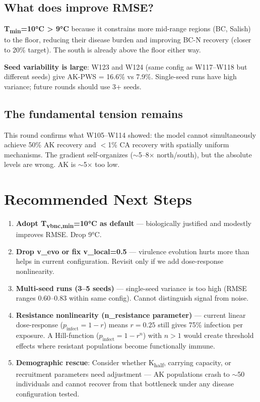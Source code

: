 \documentclass[11pt]{article}
\begin{document}
\subsection{What does improve RMSE?}

\textbf{T\textsubscript{min}=10°C > 9°C} because it constrains more mid-range regions (BC, Salish) to the floor, reducing their disease burden and improving BC-N recovery (closer to 20\% target). The south is already above the floor either way.

\textbf{Seed variability is large}: W123 and W124 (same config as W117--W118 but different seeds) give AK-PWS = 16.6\% vs 7.9\%. Single-seed runs have high variance; future rounds should use 3+ seeds.

\subsection{The fundamental tension remains}

This round confirms what W105--W114 showed: the model cannot simultaneously achieve 50\% AK recovery and $<$1\% CA recovery with spatially uniform mechanisms. The gradient self-organizes ($\sim$5--8$\times$ north/south), but the absolute levels are wrong. AK is $\sim$5$\times$ too low.

\section{Recommended Next Steps}

\begin{enumerate}
    \item \textbf{Adopt T\textsubscript{vbnc,min}=10°C as default} --- biologically justified and modestly improves RMSE. Drop 9°C.
    \item \textbf{Drop v\_evo or fix v\_local=0.5} --- virulence evolution hurts more than helps in current configuration. Revisit only if we add dose-response nonlinearity.
    \item \textbf{Multi-seed runs (3--5 seeds)} --- single-seed variance is too high (RMSE ranges 0.60--0.83 within same config). Cannot distinguish signal from noise.
    \item \textbf{Resistance nonlinearity (n\_resistance parameter)} --- current linear dose-response ($p_\text{infect} = 1 - r$) means $r=0.25$ still gives 75\% infection per exposure. A Hill-function ($p_\text{infect} = 1 - r^n$) with $n > 1$ would create threshold effects where resistant populations become functionally immune.
    \item \textbf{Demographic rescue}: Consider whether K\textsubscript{half}, carrying capacity, or recruitment parameters need adjustment --- AK populations crash to $\sim$50 individuals and cannot recover from that bottleneck under any disease configuration tested.
\end{enumerate}
\end{document}
